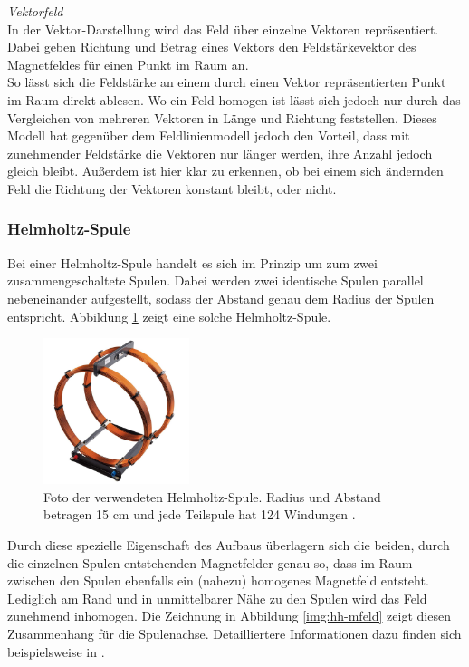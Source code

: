 \textit{Vektorfeld}\\
In der Vektor-Darstellung wird das Feld über einzelne Vektoren repräsentiert. Dabei geben Richtung und Betrag eines Vektors den Feldstärkevektor des Magnetfeldes für einen Punkt im Raum an.\\
So lässt sich die Feldstärke an einem durch einen Vektor repräsentierten Punkt im Raum direkt ablesen. Wo ein Feld homogen ist lässt sich jedoch nur durch das Vergleichen von mehreren Vektoren in Länge und Richtung feststellen. Dieses Modell hat gegenüber dem Feldlinienmodell jedoch den Vorteil, dass mit zunehmender Feldstärke die Vektoren nur länger werden, ihre Anzahl jedoch gleich bleibt. Außerdem ist hier klar zu erkennen, ob bei einem sich ändernden Feld die Richtung der Vektoren konstant bleibt, oder nicht.

\subsubsection{Helmholtz-Spule}
\label{sec-2-3-3}
Bei einer Helmholtz-Spule handelt es sich im Prinzip um zum zwei zusammengeschaltete Spulen. Dabei werden zwei identische Spulen parallel nebeneinander aufgestellt, sodass der Abstand genau dem Radius der Spulen entspricht. Abbildung \ref{img:Helmholtz} zeigt eine solche Helmholtz-Spule.\\
\begin{figure}
	\centering
	\includegraphics[width=0.38\textwidth]{images/papers/Helmholtz.jpg}
	\caption{Foto der verwendeten Helmholtz-Spule. Radius und Abstand betragen 15 cm und jede Teilspule hat 124 Windungen \cite{3BS}.}
	\label{img:Helmholtz}
\end{figure}

Durch diese spezielle Eigenschaft des Aufbaus überlagern sich die beiden, durch die einzelnen Spulen entstehenden Magnetfelder genau so, dass im Raum zwischen den Spulen ebenfalls ein (nahezu) homogenes Magnetfeld entsteht. Lediglich am Rand und in unmittelbarer Nähe zu den Spulen wird das Feld zunehmend inhomogen. Die Zeichnung in Abbildung \ref{img:hh-mfeld} zeigt diesen Zusammenhang für die Spulenachse. Detailliertere Informationen dazu finden sich beispielsweise in \cite{Demtroder13}.\\

